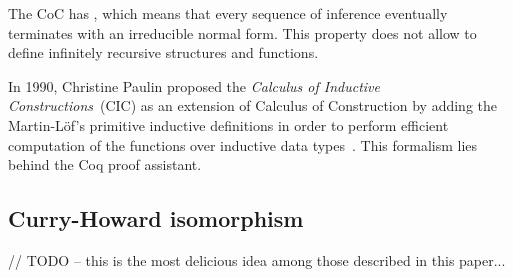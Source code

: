 \documentclass[article]{aaltoseries}
\begin{document}

The CoC has , which means that every sequence of inference eventually terminates with an irreducible normal form. This property does not allow to define infinitely recursive structures and functions. %

%

In 1990, Christine Paulin proposed the \textit{Calculus of Inductive Constructions}~(CIC) as an extension of Calculus of Construction by adding the Martin-Löf's primitive inductive definitions in order to perform efficient computation of the functions over inductive data types~\cite{Pau2015}. This formalism lies behind the Coq proof assistant.



\subsection{Curry-Howard isomorphism}
\label{sec:curry_howard}
// TODO -- this is the most delicious idea among those described in this paper...
\end{document}
